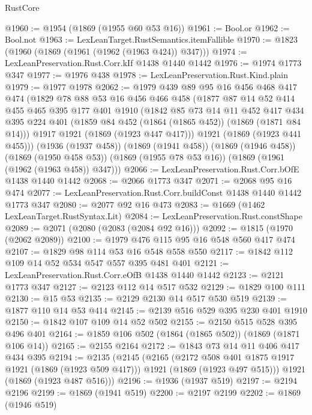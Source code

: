 \begin{lexlean}{RustCore}
\begin{coremodule}
@1960 := @1954 (@1869 (@1955 @60 @53 @16))
@1961 := Bool.or
@1962 := Bool.not
@1963 := LexLeanTarget.RustSemantics.itemFallible
@1970 := @1823 (@1960 (@1869 (@1961 (@1962 (@1963 @424)) @347)))
@1974 := LexLeanPreservation.Rust.Corr.kIf @1438 @1440 @1442
@1976 := @1974 @1773 @347
@1977 := @1976 @438
@1978 := LexLeanPreservation.Rust.Kind.plain
@1979 := @1977 @1978
@2062 := @1979
    @439
    @89
    @95
    @16
    @456
    @468
    @417
    @474
    (@1829
      @78
      @88
      @53
      @16
      @456
      @466
      @458
      (@1877
        @87
        @14
        @52
        @414
        @455
        @465
        @395
        @177
        @401
        @1910
        (@1842
          @85
          @73
          @14
          @11
          @452
          @417
          @434
          @395
          @224
          @401
          (@1859 @84 @452 (@1864 (@1865 @452)) (@1869 (@1871 @84 @14)))
          @1917
          @1921
          (@1869 (@1923 @447 @417)))
        @1921
        (@1869 (@1923 @441 @455)))
      (@1936 (@1937 @458))
      (@1869 (@1941 @458))
      (@1869 (@1946 @458))
      (@1869 (@1950 @458 @53))
      (@1869 (@1955 @78 @53 @16))
      (@1869 (@1961 (@1962 (@1963 @458)) @347)))
@2066 := LexLeanPreservation.Rust.Corr.bOfE @1438 @1440 @1442
@2068 := @2066 @1773 @347
@2071 := @2068 @95 @16 @474
@2077 := LexLeanPreservation.Rust.Corr.buildConst @1438 @1440 @1442 @1773 @347
@2080 := @2077 @92 @16 @473
@2083 := @1669 (@1462 LexLeanTarget.RustSyntax.Lit)
@2084 := LexLeanPreservation.Rust.constShape
@2089 := @2071 (@2080 (@2083 (@2084 @92 @16)))
@2092 := @1815 (@1970 (@2062 @2089))
@2100 := @1979 @476 @115 @95 @16 @548 @560 @417 @474
@2107 := @1829 @98 @114 @53 @16 @548 @558 @550
@2117 := @1842 @112 @109 @14 @52 @534 @547 @557 @395 @481 @401
@2121 := LexLeanPreservation.Rust.Corr.eOfB @1438 @1440 @1442
@2123 := @2121 @1773 @347
@2127 := @2123 @112 @14 @517 @532
@2129 := @1829 @100 @111
@2130 := @15 @53
@2135 := @2129 @2130 @14 @517 @530 @519
@2139 := @1877 @110 @14 @53 @414
@2145 := @2139 @516 @529 @395 @230 @401 @1910
@2150 := @1842 @107 @109 @14 @52 @502
@2155 := @2150 @515 @528 @395 @496 @401
@2164 := @1859 @106 @502 (@1864 (@1865 @502)) (@1869 (@1871 @106 @14))
@2165 := @2155 @2164
@2172 := @1843 @73 @14 @11 @406 @417 @434 @395
@2194 := @2135
    (@2145
      (@2165
        (@2172 @508 @401 @1875 @1917 @1921 (@1869 (@1923 @509 @417)))
        @1921
        (@1869 (@1923 @497 @515)))
      @1921
      (@1869 (@1923 @487 @516)))
@2196 := @1936 (@1937 @519)
@2197 := @2194 @2196
@2199 := @1869 (@1941 @519)
@2200 := @2197 @2199
@2202 := @1869 (@1946 @519)

\end{coremodule}
\end{lexlean}
